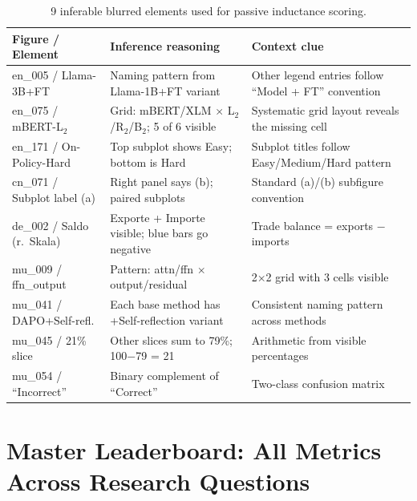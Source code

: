 \vspace{-4pt}
\begin{table}[H]
\centering
\scriptsize
\caption{9 inferable blurred elements used for passive inductance scoring.}\label{tab:inferable}
\setlength{\tabcolsep}{3pt}
\begin{tabular}{@{}l p{5cm} p{6cm}@{}}
\toprule
\textbf{Figure / Element} & \textbf{Inference reasoning} & \textbf{Context clue} \\
\midrule
en\_005 / Llama-3B+FT & Naming pattern from Llama-1B+FT variant & Other legend entries follow ``Model + FT'' convention \\
en\_075 / mBERT-L$_2$ & Grid: mBERT/XLM $\times$ L$_2$/R$_2$/B$_2$; 5 of 6 visible & Systematic grid layout reveals the missing cell \\
en\_171 / On-Policy-Hard & Top subplot shows Easy; bottom is Hard & Subplot titles follow Easy/Medium/Hard pattern \\
cn\_071 / Subplot label (a) & Right panel says (b); paired subplots & Standard (a)/(b) subfigure convention \\
de\_002 / Saldo (r.\ Skala) & Exporte + Importe visible; blue bars go negative & Trade balance = exports $-$ imports \\
mu\_009 / ffn\_output & Pattern: attn/ffn $\times$ output/residual & 2$\times$2 grid with 3 cells visible \\
mu\_041 / DAPO+Self-refl. & Each base method has +Self-reflection variant & Consistent naming pattern across methods \\
mu\_045 / 21\% slice & Other slices sum to 79\%; 100$-$79 = 21 & Arithmetic from visible percentages \\
mu\_054 / ``Incorrect'' & Binary complement of ``Correct'' & Two-class confusion matrix \\
\bottomrule
\end{tabular}
\end{table}


\newpage
\section{Master Leaderboard: All Metrics Across Research Questions}
\label{app:master-leaderboard}

